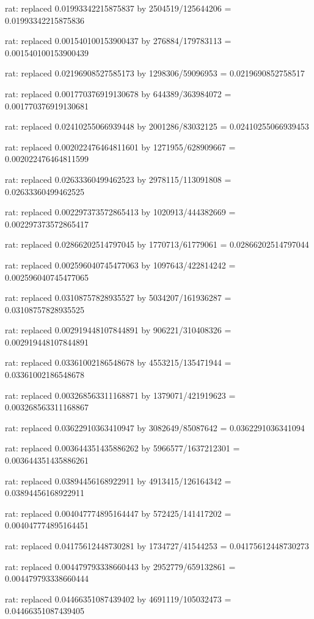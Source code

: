 \documentclass[a4paper,10pt]{article}
\begin{document}
\begin{eulernotebook}
\begin{eulercomment}
\begin{eulercomment}
\begin{eulercomment}
\begin{eulercomment}
\begin{eulercomment}
\begin{eulercomment}
\begin{eulercomment}
\begin{eulercomment}
\begin{eulercomment}
\begin{eulercomment}
\begin{eulercomment}
\begin{eulercomment}
\begin{eulercomment}
\begin{eulercomment}
\begin{eulercomment}
\begin{eulercomment}
\begin{euleroutput}
  rat: replaced 0.01993342215875837 by 2504519/125644206 = 0.01993342215875836
  
  rat: replaced 0.001540100153900437 by 276884/179783113 = 0.001540100153900439
  
  rat: replaced 0.02196908527585173 by 1298306/59096953 = 0.0219690852758517
  
  rat: replaced 0.001770376919130678 by 644389/363984072 = 0.001770376919130681
  
  rat: replaced 0.02410255066939448 by 2001286/83032125 = 0.02410255066939453
  
  rat: replaced 0.002022476464811601 by 1271955/628909667 = 0.002022476464811599
  
  rat: replaced 0.02633360499462523 by 2978115/113091808 = 0.02633360499462525
  
  rat: replaced 0.002297373572865413 by 1020913/444382669 = 0.002297373572865417
  
  rat: replaced 0.02866202514797045 by 1770713/61779061 = 0.02866202514797044
  
  rat: replaced 0.002596040745477063 by 1097643/422814242 = 0.002596040745477065
  
  rat: replaced 0.03108757828935527 by 5034207/161936287 = 0.03108757828935525
  
  rat: replaced 0.002919448107844891 by 906221/310408326 = 0.002919448107844891
  
  rat: replaced 0.03361002186548678 by 4553215/135471944 = 0.03361002186548678
  
  rat: replaced 0.003268563311168871 by 1379071/421919623 = 0.003268563311168867
  
  rat: replaced 0.03622910363410947 by 3082649/85087642 = 0.0362291036341094
  
  rat: replaced 0.003644351435886262 by 5966577/1637212301 = 0.003644351435886261
  
  rat: replaced 0.03894456168922911 by 4913415/126164342 = 0.03894456168922911
  
  rat: replaced 0.004047774895164447 by 572425/141417202 = 0.004047774895164451
  
  rat: replaced 0.04175612448730281 by 1734727/41544253 = 0.04175612448730273
  
  rat: replaced 0.004479793338660443 by 2952779/659132861 = 0.004479793338660444
  
  rat: replaced 0.04466351087439402 by 4691119/105032473 = 0.04466351087439405
  

\end{euleroutput}
\end{eulercomment}
\end{eulercomment}
\end{eulercomment}
\end{eulercomment}
\end{eulercomment}
\end{eulercomment}
\end{eulercomment}
\end{eulercomment}
\end{eulercomment}
\end{eulercomment}
\end{eulercomment}
\end{eulercomment}
\end{eulercomment}
\end{eulercomment}
\end{eulercomment}
\end{eulercomment}
\end{eulernotebook}
\end{document}
